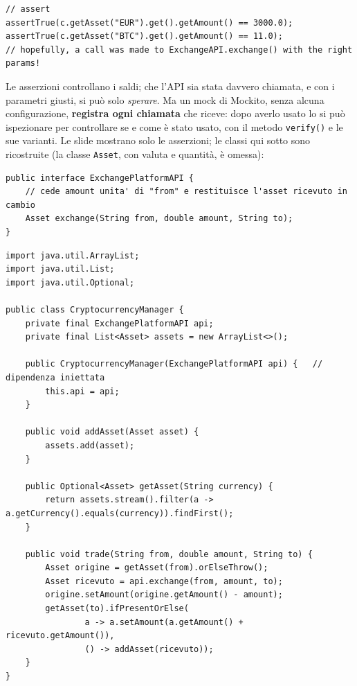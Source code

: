 \begin{lstlisting}[style=java]
// assert
assertTrue(c.getAsset("EUR").get().getAmount() == 3000.0);
assertTrue(c.getAsset("BTC").get().getAmount() == 11.0);
// hopefully, a call was made to ExchangeAPI.exchange() with the right params!
\end{lstlisting}

Le asserzioni controllano i saldi; che l'API sia stata davvero chiamata, e con i parametri giusti, si può solo
\textit{sperare}. Ma un mock di Mockito, senza alcuna configurazione, \textbf{registra ogni chiamata} che riceve: dopo
averlo usato lo si può ispezionare per controllare se e come è stato usato, con il metodo \texttt{verify()} e le sue
varianti. Le slide mostrano solo le asserzioni; le classi qui sotto sono ricostruite (la classe \texttt{Asset}, con
valuta e quantità, è omessa):

\begin{lstlisting}[style=java, name=ExchangePlatformAPI.java]
public interface ExchangePlatformAPI {
    // cede amount unita' di "from" e restituisce l'asset ricevuto in cambio
    Asset exchange(String from, double amount, String to);
}
\end{lstlisting}

\begin{lstlisting}[style=java, name=CryptocurrencyManager.java]
import java.util.ArrayList;
import java.util.List;
import java.util.Optional;

public class CryptocurrencyManager {
    private final ExchangePlatformAPI api;
    private final List<Asset> assets = new ArrayList<>();

    public CryptocurrencyManager(ExchangePlatformAPI api) {   // dipendenza iniettata
        this.api = api;
    }

    public void addAsset(Asset asset) {
        assets.add(asset);
    }

    public Optional<Asset> getAsset(String currency) {
        return assets.stream().filter(a -> a.getCurrency().equals(currency)).findFirst();
    }

    public void trade(String from, double amount, String to) {
        Asset origine = getAsset(from).orElseThrow();
        Asset ricevuto = api.exchange(from, amount, to);
        origine.setAmount(origine.getAmount() - amount);
        getAsset(to).ifPresentOrElse(
                a -> a.setAmount(a.getAmount() + ricevuto.getAmount()),
                () -> addAsset(ricevuto));
    }
}
\end{lstlisting}

